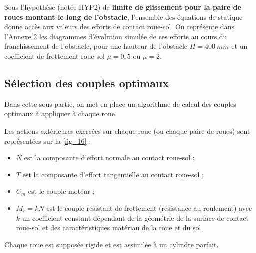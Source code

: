 
Sous l'hypothèse (notée HYP2) de \textbf{limite de glissement pour la paire de roues montant le long
de l'obstacle}, l'ensemble des équations de statique donne accès aux valeurs des efforts de
contact roue-sol. On représente dans l'Annexe 2 les diagrammes d'évolution simulée de ces efforts
au cours du franchissement de l'obstacle, pour une hauteur de l'obstacle $H =\SI{400}{mm}$ et un
coefficient de frottement roue-sol $\mu = 0,5$ ou $\mu = 2$.




\subsection{Sélection des couples optimaux}

\begin{obj}
Dans cette sous-partie, on met en place un algorithme de calcul des couples optimaux à
appliquer à chaque roue.
\end{obj}


Les actions extérieures exercées sur chaque roue (ou chaque paire de roues) sont représentées
sur la \autoref{fig_16} :
\begin{itemize}
\item $N$ est la composante d'effort normale au contact roue-sol ;
\item $T$ est la composante d'effort tangentielle au contact roue-sol ;
\item $C_m$ est le couple moteur ;
\item $M_r=k N$ est le couple résistant de frottement (résistance au roulement) avec $k$ un
coefficient constant dépendant de la géométrie de la surface de contact roue-sol et des
caractéristiques matériau de la roue et du sol.
\end{itemize}

Chaque roue est supposée rigide et est assimilée à un cylindre parfait.

